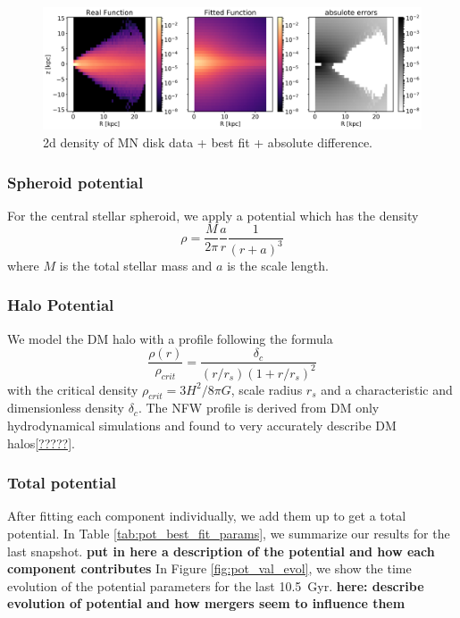 \begin{figure}
    \centering
    \includegraphics[width = \textwidth]{plots/Auriga/MND_best_fit.png}
    \caption{2d density of MN disk data + best fit + absolute difference.}
    \label{fig:MND}
\end{figure}

\subsubsection{Spheroid potential}\label{subsubsec:spher_pot}
For the central stellar spheroid, we apply a \citet{Hernquistprofile} potential which has the density 
\begin{equation}
    \rho = \frac{M}{2\pi}\frac{a}{r}\frac{1}{(r+a)^3}
\end{equation}
where $M$ is the total stellar mass and $a$ is the scale length. 





\subsubsection{Halo Potential}\label{subsubsec:halo_pot}
We model the \ac{DM} halo with a \citet{NFWprofile} profile following the formula 
\begin{equation}
    \frac{\rho(r)}{\rho_{crit}} = \frac{\delta_c}{(r/r_s)(1+r/r_s)^2}
\end{equation} with the critical density $\rho_{crit} = 3H^2 / 8\pi G $, scale radius $r_s$  and a characteristic and dimensionless density $\delta_c$. The \ac{NFW} profile is derived from \ac{DM} only hydrodynamical simulations and found to very accurately describe \ac{DM} halos\ref{?????}.






\subsubsection{Total potential}\label{subsubsec:tot_pot}
After fitting each component individually, we add them up to get a total potential. In Table \ref{tab:pot_best_fit_params}, we summarize our results for the last snapshot. \textbf{put in here a description of the potential and how each component contributes}
In Figure \ref{fig:pot_val_evol}, we show the time evolution of the potential parameters for the last \SI{10.5}{Gyr}. \textbf{here: describe evolution of potential and how mergers seem to influence them}

